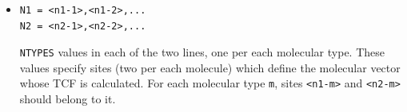 \documentclass{article}
\begin{document}
\begin{itemize}
\begin{itemize}
\item
\verb|<i10>,<i11>,<i12>| - X, Y, and Z projections of the angular molecular
velocity. The projections are calculated in the laboratory frame if 
the flags are equal to 1, and they are calculated in the principal
molecular frame determined by the axis of the inertia tensor if the
corresponding flags are equal to 2.

\end{itemize}

\item
\begin{verbatim}
N1 = <n1-1>,<n1-2>,...
N2 = <n2-1>,<n2-2>,...
\end{verbatim}

\verb|NTYPES| values in each of the two lines, one per each molecular type.
These values specify sites (two per each molecule) which define the
molecular vector whose TCF is calculated. For each molecular type \verb|m|,
sites  \verb|<n1-m>| and \verb|<n2-m>| should belong to it.

\end{itemize}
\end{document}
